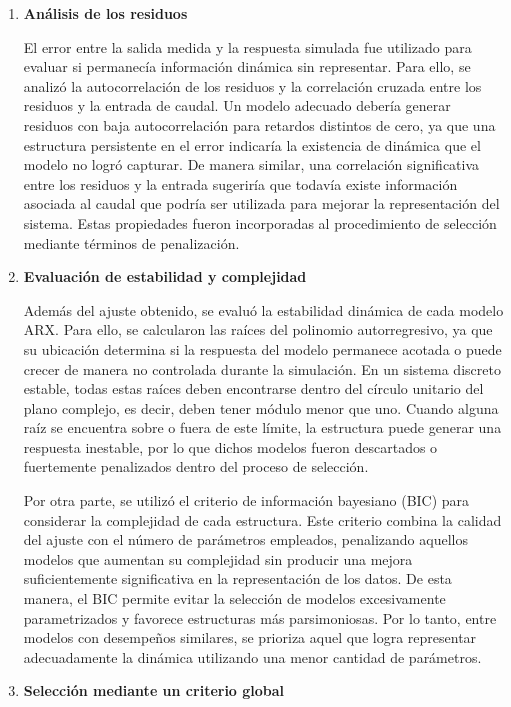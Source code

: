 \documentclass[11pt]{report}
\begin{document}
\begin{enumerate}
    \item \textbf{Análisis de los residuos}

    El error entre la salida medida y la respuesta simulada fue utilizado para evaluar si permanecía información dinámica sin representar. Para ello, se analizó la autocorrelación de los residuos y la correlación cruzada entre los residuos y la entrada de caudal. Un modelo adecuado debería generar residuos con baja autocorrelación para retardos distintos de cero, ya que una estructura persistente en el error indicaría la existencia de dinámica que el modelo no logró capturar. De manera similar, una correlación significativa entre los residuos y la entrada sugeriría que todavía existe información asociada al caudal que podría ser utilizada para mejorar la representación del sistema. Estas propiedades fueron incorporadas al procedimiento de selección mediante términos de penalización.
    
    \item \textbf{Evaluación de estabilidad y complejidad}
    
    Además del ajuste obtenido, se evaluó la estabilidad dinámica de cada modelo ARX. Para ello, se calcularon las raíces del polinomio autorregresivo, ya que su ubicación determina si la respuesta del modelo permanece acotada o puede crecer de manera no controlada durante la simulación. En un sistema discreto estable, todas estas raíces deben encontrarse dentro del círculo unitario del plano complejo, es decir, deben tener módulo menor que uno. Cuando alguna raíz se encuentra sobre o fuera de este límite, la estructura puede generar una respuesta inestable, por lo que dichos modelos fueron descartados o fuertemente penalizados dentro del proceso de selección.

Por otra parte, se utilizó el criterio de información bayesiano (BIC) para considerar la complejidad de cada estructura. Este criterio combina la calidad del ajuste con el número de parámetros empleados, penalizando aquellos modelos que aumentan su complejidad sin producir una mejora suficientemente significativa en la representación de los datos. De esta manera, el BIC permite evitar la selección de modelos excesivamente parametrizados y favorece estructuras más parsimoniosas. Por lo tanto, entre modelos con desempeños similares, se prioriza aquel que logra representar adecuadamente la dinámica utilizando una menor cantidad de parámetros.

    
    \item \textbf{Selección mediante un criterio global}
    

\end{enumerate}
\end{document}
